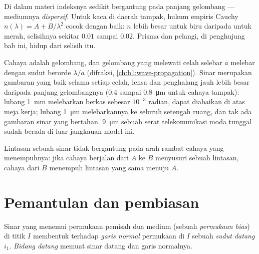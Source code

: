 \begin{remark}[Dispersi]\label{rem:b1:rays-reflection-refraction:dispersion}
Di dalam materi indeksnya sedikit bergantung pada panjang gelombang ---
mediumnya \emph{dispersif}. Untuk kaca di daerah tampak, hukum empiris
Cauchy $n(\lambda) = A + B/\lambda^2$ cocok dengan baik: $n$ lebih besar
untuk biru daripada untuk merah, selisihnya sekitar $0.01$ sampai
$0.02$. Prisma dan pelangi, di penghujung bab ini, hidup dari selisih itu.
\end{remark}

\begin{remark}\label{rem:b1:rays-reflection-refraction:limits}
Cahaya adalah gelombang, dan gelombang yang melewati celah selebar $a$
melebar dengan sudut berorde $\lambda/a$ (difraksi,
\cref{ch:b1:wave-propagation}). Sinar merupakan gambaran yang baik
selama setiap celah, lensa dan penghalang jauh lebih besar daripada
panjang gelombangnya (\qty{0.4}{} sampai \qty{0.8}{\micro m} untuk
cahaya tampak): lubang \qty{1}{mm} melebarkan berkas sebesar $10^{-3}$
radian, dapat diabaikan di atas meja kerja; lubang \qty{1}{\micro m}
melebarkannya ke seluruh setengah ruang, dan tak ada gambaran sinar
yang bertahan.  \qty{9}{\micro m} sebuah serat telekomunikasi moda
tunggal sudah berada di luar jangkauan model ini.
\end{remark}

\begin{proposition}\label{prop:b1:rays-reflection-refraction:reversibility}
Lintasan sebuah sinar tidak bergantung pada arah rambat cahaya yang
menempuhnya: jika cahaya berjalan dari $A$ ke $B$ menyusuri sebuah
lintasan, cahaya dari $B$ menempuh lintasan yang sama menuju $A$.
\end{proposition}
\admitted

\section{Pemantulan dan pembiasan}

\begin{definition}\label{def:b1:rays-reflection-refraction:incidence}
Sinar yang menemui permukaan pemisah dua medium (sebuah
\emph{permukaan bias}) di titik $I$ membentuk terhadap \emph{garis
normal} permukaan di $I$ sebuah \emph{sudut datang} $i_1$. \emph{Bidang
datang} memuat sinar datang dan garis normalnya.
\end{definition}

